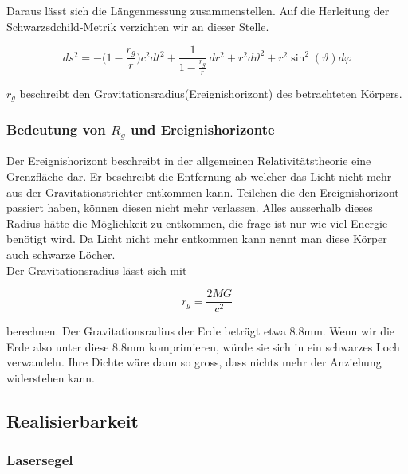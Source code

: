 \begin{refsection}
	Daraus lässt sich die Längenmessung zusammenstellen. Auf die Herleitung der Schwarzsdchild-Metrik verzichten wir an dieser Stelle.

	\begin{equation}
	ds^2
	=
	-\biggl(1-\frac{r_g}r\biggr)c^2dt^2
	+
	\frac{1}{\displaystyle 1-\frac{r_g}r}\,dr^2 
	+
	r^2d\vartheta^2 
	+ 
	r^2\sin^2(\vartheta)d\varphi
	\end{equation}

	$r_g$ beschreibt den Gravitationsradius(Ereignishorizont) des betrachteten Körpers.

	\subsubsection{Bedeutung von $R_{g}$ und Ereignishorizonte}


	Der Ereignishorizont beschreibt in der allgemeinen Relativitätstheorie eine Grenzfläche dar. Er beschreibt die Entfernung ab welcher das Licht nicht mehr aus der Gravitationstrichter entkommen kann. Teilchen die den Ereignishorizont passiert haben, können diesen nicht mehr verlassen. Alles ausserhalb dieses Radius hätte die Möglichkeit zu entkommen, die frage ist nur wie viel Energie benötigt wird. Da Licht nicht mehr entkommen kann nennt man diese Körper auch schwarze Löcher.\\
	Der Gravitationsradius lässt sich mit 

	\begin{equation}
	r_{g}= \frac{2MG}{c^2}
	\end{equation}

	berechnen.
	Der Gravitationsradius der Erde beträgt etwa 8.8mm. Wenn wir die Erde also unter  diese 8.8mm komprimieren, würde sie sich in ein schwarzes Loch verwandeln. Ihre Dichte wäre dann so gross, dass nichts mehr der Anziehung widerstehen kann.
	
	\subsection{Realisierbarkeit}
	
	
	\subsubsection{Lasersegel}
	

\end{refsection}
